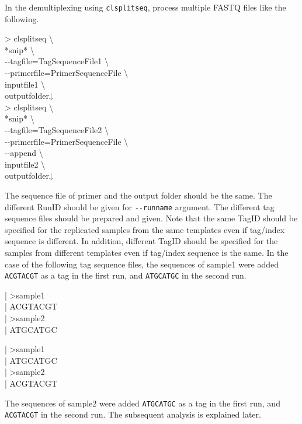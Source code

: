 \documentclass[titlepage,10pt,a4paper,english]{jsbook}
\newenvironment{content}{\begin{shaded}\vspace{-1em}\raggedright\ttfamily\footnotesize\setlength{\baselineskip}{1.4em}}{\end{shaded}\vspace{-1em}}
\newenvironment{cmd}{\begin{oframed}\raggedright\ttfamily\footnotesize\setlength{\baselineskip}{1.4em}}{\end{oframed}\vspace{-1em}}
\begin{document}
In the demultiplexing using \texttt{clsplitseq}, process multiple FASTQ files like the following.
\begin{cmd}
{\textgreater} clsplitseq {\textbackslash}\\
*snip* {\textbackslash}\\
{-}{-}tagfile=TagSequenceFile1 {\textbackslash}\\
{-}{-}primerfile=PrimerSequenceFile {\textbackslash}\\
inputfile1 {\textbackslash}\\
outputfolder↓\\
{\textgreater} clsplitseq {\textbackslash}\\
*snip* {\textbackslash}\\
{-}{-}tagfile=TagSequenceFile2 {\textbackslash}\\
{-}{-}primerfile=PrimerSequenceFile {\textbackslash}\\
{-}{-}append {\textbackslash}\\
inputfile2 {\textbackslash}\\
outputfolder↓
\end{cmd}
The sequence file of primer and the output folder should be the same.
The different RunID should be given for \texttt{{-}{-}runname} argument.
The different tag sequence files should be prepared and given.
Note that the same TagID should be specified for the replicated samples from the same templates even if tag/index sequence is different.
In addition, different TagID should be specified for the samples from different templates even if tag/index sequence is the same.
In the case of the following tag sequence files, the sequences of sample1 were added \texttt{ACGTACGT} as a tag in the first run, and \texttt{ATGCATGC} in the second run.
\begin{content}
| {\textgreater}sample1\\
| ACGTACGT\\
| {\textgreater}sample2\\
| ATGCATGC
\end{content}
\begin{content}
| {\textgreater}sample1\\
| ATGCATGC\\
| {\textgreater}sample2\\
| ACGTACGT
\end{content}
The sequences of sample2 were added \texttt{ATGCATGC} as a tag in the first run, and \texttt{ACGTACGT} in the second run.
The subsequent analysis is explained later.
\end{document}
